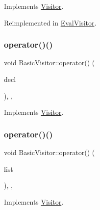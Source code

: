 Implements \hyperlink{struct_visitor_a768e64f6e6fffb7440e3c1f1a78d9481}{Visitor}.



Reimplemented in \hyperlink{class_eval_visitor_a9300ec33c193788bec2484b0d99c7fa3}{Eval\+Visitor}.

\mbox{\label{struct_basic_visitor_a365071938626ac065ac413ba0e6d382f}} 
\subsubsection{\texorpdfstring{operator()()}{operator()()}\hspace{0.1cm}{\footnotesize\ttfamily [52/60]}}
{\footnotesize\ttfamily void Basic\+Visitor\+::operator() (\begin{DoxyParamCaption}\item[{const \hyperlink{struct_program_declaration}{Program\+Declaration} \&}]{decl }\end{DoxyParamCaption})\hspace{0.3cm}{\ttfamily [inline]}, {\ttfamily [override]}, {\ttfamily [virtual]}}



Implements \hyperlink{struct_visitor_ab6afd14c23c1fa6f01d24e2593ac91bf}{Visitor}.

\mbox{\label{struct_basic_visitor_ae04e6bd948d2f85acaff8744ad6ab0d7}} 
\subsubsection{\texorpdfstring{operator()()}{operator()()}\hspace{0.1cm}{\footnotesize\ttfamily [53/60]}}
{\footnotesize\ttfamily void Basic\+Visitor\+::operator() (\begin{DoxyParamCaption}\item[{const \hyperlink{struct_element_list}{Element\+List} \&}]{list }\end{DoxyParamCaption})\hspace{0.3cm}{\ttfamily [inline]}, {\ttfamily [override]}, {\ttfamily [virtual]}}



Implements \hyperlink{struct_visitor_a339d238c4c4b3c356878817481b398be}{Visitor}.

